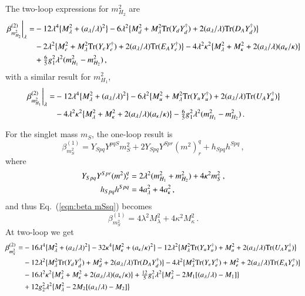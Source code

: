 \documentclass[final,3p,times,pdflatex]{elsarticle}
\newcommand{\lamsq}{\lambda^2}
\newcommand{\kapsq}{\kappa^2}
\newcommand{\tr}{\mathrm{Tr}}
\newcommand{\mhusq}{m^2_{H_2}}
\newcommand{\mhdsq}{m^2_{H_1}}
\newcommand{\mlamsq}{M_\lambda^2}
\newcommand{\mkapsq}{M_\kappa^2}
\newcommand{\Alam}{a_\lambda/\lambda}
\newcommand{\Akap}{a_\kappa/\kappa}
\newcommand{\Musq}{M_u^2}
\newcommand{\Mdsq}{M_d^2}
\newcommand{\Mesq}{M_e^2}
\begin{document}
The two-loop expressions for $m_{H_2}^2$ are 
%
\begin{align}
\left.\beta_{m_{H_2}^2}^{(2)}\right|_\lambda =& -12\lambda^4\big\{ M_\lambda^2 + (\Alam)^2\big\} 
- 6\lamsq\big\{ \Mdsq + M_\lambda^2\tr( Y_d Y_d^\dagger) + 2(a_\lambda/\lambda)\tr( D_A Y_d^\dagger) \big\} \notag \\
%
&-2\lamsq\big\{ \Mesq + M_\lambda^2\tr( Y_e Y_e^\dagger) + 2(a_\lambda/\lambda)\tr( E_A Y_e^\dagger)\big\}
%
-4\lamsq\kapsq\big\{ M_\lambda^2 + M_\kappa^2 + 2(a_\lambda/\lambda)(a_\kappa/\kappa) \big\}  \notag \\
%
&+ \tfrac{6}{5}g_1^2\lamsq(\mhdsq-\mhusq) \,,
\end{align}
%
with a similar result for $m_{H_1}^2$,
%
\begin{align}
\left.\beta_{m_{H_1}^2}^{(2)}\right|_\lambda =& -12\lambda^4\big\{M_\lambda^2 + (\Alam)^2\big\} 
- 6\lamsq\big\{ \Musq + M_\lambda^2\tr( Y_u Y_u^\dagger) + 2(a_\lambda/\lambda)\tr( U_A Y_u^\dagger) \big\} \notag \\
%
&-4\lamsq\kapsq\big\{ M_\lambda^2 + M_\kappa^2 + 2(a_\lambda/\lambda)(a_\kappa/\kappa) \big\} 
- \tfrac{6}{5}g_1^2\lamsq(\mhdsq-\mhusq)\,.
\end{align}

For the singlet mass $m_S$, the one-loop result is
%
\begin{equation}
\beta_{m_S^2}^{(1)} = Y_{Spq}Y^{pqS}m_S^2 + 2Y_{Spq}Y^{Spr}(m^2)^q_r + h_{Spq}h^{Spq}\,, \label{eqn:beta mSsq}
\end{equation}
%
where 
%
\begin{align}
Y_{Spq}Y^{Spr}(m^2)^q_r &= 2\lamsq(\mhdsq + \mhusq) + 4\kapsq m_S^2\,, \notag \\
%
h_{Spq}h^{Spq} &= 4a_\lambda^2 + 4a_\kappa^2\,,
\end{align}
%
and thus Eq.~(\ref{eqn:beta mSsq}) becomes
%
\begin{equation}
\beta_{m_S^2}^{(1)} = 4\lamsq \mlamsq + 4\kapsq \mkapsq\,.
\end{equation}
%
At two-loop we get
\begin{align}
\beta_{m_S^2}^{(2)} =& -16\lambda^4\big\{ \mlamsq + (\Alam)^2\big\} - 32\kappa^4\big\{ \mkapsq + (\Akap)^2\big\}
-12\lamsq\big\{ \mlamsq\tr( Y_u Y_u^\dagger) + \Musq + 2(\Alam)\tr( U_A Y_u^\dagger)\big\} \notag \\
%
&- 12\lamsq\big\{ \mlamsq\tr( Y_d Y_d^\dagger) + \Mdsq + 2(\Alam)\tr( D_A Y_d^\dagger) \big\} 
- 4\lamsq\big\{ \mlamsq\tr( Y_e Y_e^\dagger) + \Mesq + 2(\Alam)\tr( E_A Y_e^\dagger) \big\} \notag \\
%
&- 16\lamsq\kapsq\big\{ \mlamsq + \mkapsq + 2(\Alam)(\Akap) \big\}
+ \tfrac{12}{5}g_1^2\lamsq \big\{ \mlamsq - 2M_1[(\Alam) - M_1] \big\} \notag \\
%
&+ 12g_2^2\lamsq\big\{ \mlamsq -2M_2[(\Alam) - M_2]\big\}
\end{align}
\end{document}
